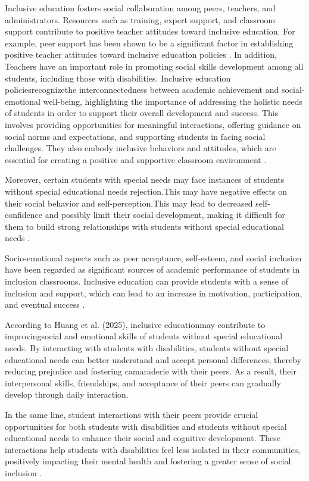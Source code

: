 \documentclass[10pt]{NSP1}
\begin{document}
Inclusive education fosters social collaboration among peers, teachers, and administrators. Resources such as training, expert support, and classroom support contribute to positive teacher attitudes toward inclusive education. For example, peer support has been shown to be a significant factor in establishing positive teacher attitudes toward inclusive education policies \cite{7}. In addition, Teachers have an important role in promoting social skills development among all students, including those with disabilities. Inclusive education policiesrecognizethe interconnectedness between academic achievement and social-emotional well-being, highlighting the importance of addressing the holistic needs of students in order to support their overall development and success. This involves providing opportunities for meaningful interactions, offering guidance on social norms and expectations, and supporting students in facing social challenges. They also embody inclusive behaviors and attitudes, which are essential for creating a positive and supportive classroom environment \cite{16}.

Moreover, certain students with special needs may face instances of students without special educational needs rejection.This may have negative effects on their social behavior and self-perception.This may lead to decreased self-confidence and possibly limit their social development, making it difficult for them to build strong relationships with students without special educational needs \cite{6}.

Socio-emotional aspects such as peer acceptance, self-esteem, and social inclusion have been regarded as significant sources of academic performance of students in inclusion classrooms. Inclusive education can provide students with a sense of inclusion and support, which can lead to an increase in motivation, participation, and eventual success \cite{3}.

According to Huang et al. (2025), inclusive educationmay contribute to improvingsocial and emotional skills of students without special educational needs. By interacting with students with disabilities, students without special educational needs can better understand and accept personal differences, thereby reducing prejudice and fostering camaraderie with their peers. As a result, their interpersonal skills, friendships, and acceptance of their peers can gradually develop through daily interaction.

In the same line, student interactions with their peers provide crucial opportunities for both students with disabilities and students without special educational needs to enhance their social and cognitive development. These interactions help students with disabilities feel less isolated in their communities, positively impacting their mental health and fostering a greater sense of social inclusion \cite{15}.
\end{document}

